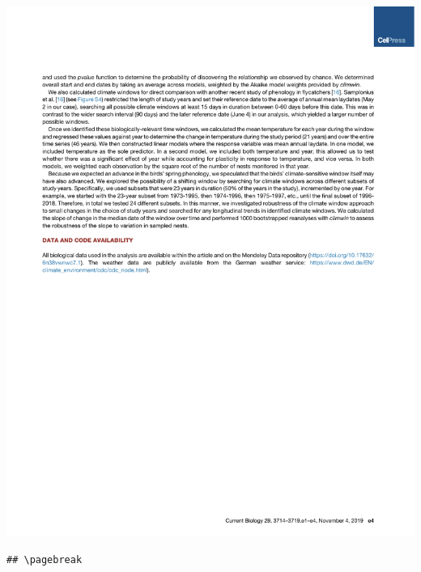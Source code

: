 \documentclass[a4paper, twoside]{templates/ociamthesis}
\begin{document}
\begin{center}\includegraphics[width=1\linewidth]{pdf_chapters/pied/pied_crop_Part10} \end{center}

\begin{verbatim}
## \pagebreak
\end{verbatim}
\end{document}
